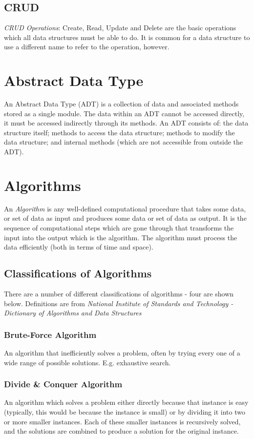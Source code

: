 \subsection{CRUD}
\textit{CRUD Operations}: Create, Read, Update and Delete are the basic operations which all data structures must be able to do. It is common for a data structure to use a different name to refer to the operation, however. 

\section{Abstract Data Type}
An Abstract Data Type (ADT) is a collection of data and associated methods stored as a single module. The data within an ADT cannot be accessed directly, it must be accessed indirectly through its methods. An ADT consists of: the data structure itself; methods to access the data structure; methods to modify the data structure; and internal methods (which are not accessible from outside the ADT).

\section{Algorithms}
An \textit{Algorithm} is any well-defined computational procedure that takes some data, or set of data as input and produces some data or set of data as output. It is the sequence of computational steps which are gone through that transforms the input into the output which is the algorithm. The algorithm must process the data efficiently (both in terms of time and space).

\subsection{Classifications of Algorithms}
There are a number of different classifications of algorithms - four are shown below. Definitions are from \textit{National Institute of Standards and Technology - Dictionary of Algorithms and Data Structures}
\subsubsection{Brute-Force Algorithm}
An algorithm that inefficiently solves a problem, often by trying every one of a wide range of possible solutions. E.g. exhaustive search.
\subsubsection{Divide \& Conquer Algorithm}
An algorithm which solves a problem either directly because that instance is easy (typically, this would be because the instance is small) or by dividing it into two or more smaller instances. Each of these smaller instances is recursively solved, and the solutions are combined to produce a solution for the original instance.
